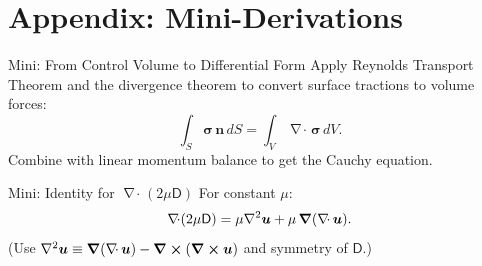 \documentclass[aspectratio=169]{beamer}
\newcommand{\uu}{\bm{u}}
\newcommand{\n}{\bm{n}}
\newcommand{\D}{\mathsf{D}} %
\DeclareMathOperator{\divg}{\nabla\!\cdot}
\begin{document}
\section{Appendix: Mini-Derivations}

\begin{frame}{Mini: From Control Volume to Differential Form}
Apply Reynolds Transport Theorem and the divergence theorem to convert surface tractions to volume forces:
\[
\int_S \bm{\sigma}\,\n\,dS = \int_V \divg \bm{\sigma}\, dV.
\]
Combine with linear momentum balance to get the Cauchy equation.
\end{frame}

\begin{frame}{Mini: Identity for $\divg(2\mu \D)$}
For constant $\mu$:
\[
\divg(2\mu \D)
= \mu \nabla^2 \uu + \mu\,\grad(\divg \uu).
\]
(Use $\nabla^2 \uu \equiv \grad(\divg\uu) - \curl(\curl\uu)$ and symmetry of $\D$.)
\end{frame}
\end{document}
